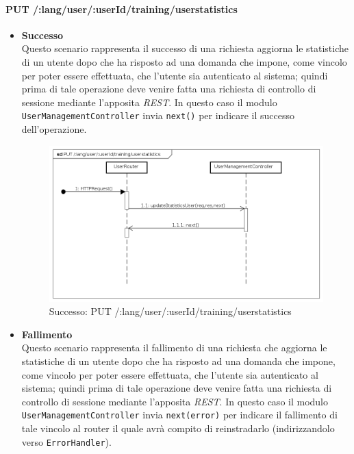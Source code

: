 \paragraph{PUT /:lang/user/:userId/training/userstatistics} %
\begin{itemize}
\item \textbf{Successo}\\
Questo scenario rappresenta il successo di una richiesta aggiorna le statistiche di un utente dopo che ha risposto ad una domanda che impone, come vincolo per poter essere effettuata, che l'utente sia autenticato al sistema; quindi prima di tale operazione deve venire fatta una richiesta di controllo di sessione mediante l'apposita \textit{REST}. In questo caso il modulo \texttt{UserManagementController} invia \texttt{next()} per indicare il successo dell'operazione.

\begin{figure}[ht]
	\centering
	\includegraphics[scale=0.45]{UML/DiagrammiDiSequenza/Back-end/PUT__lang_user__userId_training_userstatistics_success.png}
	\caption{Successo: PUT /:lang/user/:userId/training/userstatistics}
\end{figure}
\FloatBarrier

\item \textbf{Fallimento}\\
Questo scenario rappresenta il fallimento di una richiesta che aggiorna le statistiche di un utente dopo che ha risposto ad una domanda che impone, come vincolo per poter essere effettuata, che l'utente sia autenticato al sistema; quindi prima di tale operazione deve venire fatta una richiesta di controllo di sessione mediante l'apposita \textit{REST}. In questo caso il modulo \texttt{UserManagementController} invia \texttt{next(error)} per indicare il fallimento di tale vincolo al router il quale avrà compito di reinstradarlo (indirizzandolo verso \texttt{ErrorHandler}).


\end{itemize}
